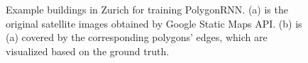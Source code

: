 \begin{figure}[!h]
{	}
    \caption{Example buildings in Zurich for training PolygonRNN. (a) is the original satellite images obtained by Google Static Maps API. (b) is (a) covered by the corresponding polygons' edges, which are visualized based on the ground truth.}
	\label{fig:egbui}
\end{figure}